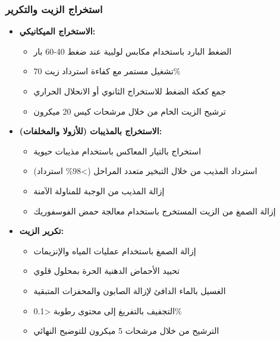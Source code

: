 \subsubsection{استخراج الزيت والتكرير}
\begin{itemize}
    \item \textbf{الاستخراج الميكانيكي:}
    \begin{itemize}
        \item الضغط البارد باستخدام مكابس لولبية عند ضغط 40-60 بار
        \item تشغيل مستمر مع كفاءة استرداد زيت 70\%
        \item جمع كعكة الضغط للاستخراج الثانوي أو الانحلال الحراري
        \item ترشيح الزيت الخام من خلال مرشحات كيس 20 ميكرون
    \end{itemize}
    
    \item \textbf{الاستخراج بالمذيبات (للأزولا والمخلفات):}
    \begin{itemize}
        \item استخراج بالتيار المعاكس باستخدام مذيبات حيوية
        \item استرداد المذيب من خلال التبخير متعدد المراحل (>98\% استرداد)
        \item إزالة المذيب من الوجبة للمناولة الآمنة
        \item إزالة الصمغ من الزيت المستخرج باستخدام معالجة حمض الفوسفوريك
    \end{itemize}
    
    \item \textbf{تكرير الزيت:}
    \begin{itemize}
        \item إزالة الصمغ باستخدام عمليات المياه والإنزيمات
        \item تحييد الأحماض الدهنية الحرة بمحلول قلوي
        \item الغسيل بالماء الدافئ لإزالة الصابون والمحفزات المتبقية
        \item التجفيف بالتفريغ إلى محتوى رطوبة <0.1\%
        \item الترشيح من خلال مرشحات 5 ميكرون للتوضيح النهائي
    \end{itemize}
\end{itemize}

